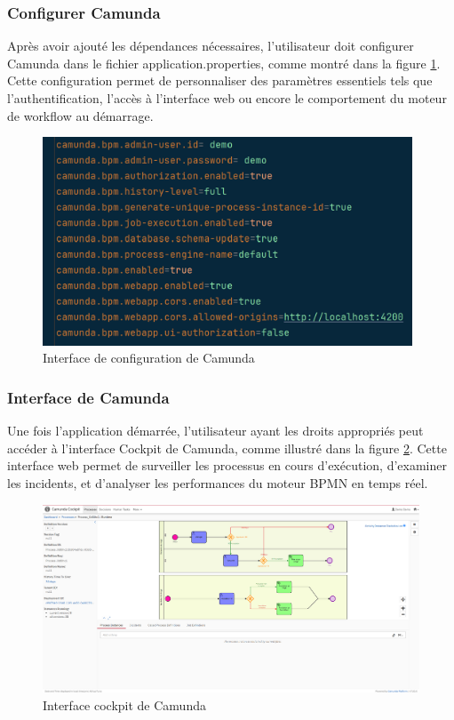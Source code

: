 \subsubsection{Configurer Camunda}
Après avoir ajouté les dépendances nécessaires, l’utilisateur doit configurer Camunda dans le fichier application.properties, comme montré dans la figure \ref{fig:camunda-config}. Cette configuration permet de personnaliser des paramètres essentiels tels que l’authentification, l’accès à l’interface web ou encore le comportement du moteur de workflow au démarrage.
\begin{figure}[H]
     \centering
     \includegraphics[width=11cm]{images/realisation/camm.png}
     \caption{Interface de configuration de Camunda}
     \label{fig:camunda-config}
\end{figure}
\newpage
\subsubsection{Interface de Camunda}
Une fois l’application démarrée, l’utilisateur ayant les droits appropriés peut accéder à l’interface Cockpit de Camunda, comme illustré dans la figure \ref{fig:camunda-cockpit}. Cette interface web permet de surveiller les processus en cours d’exécution, d’examiner les incidents, et d’analyser les performances du moteur BPMN en temps réel.
\begin{figure}[H]
     \centering
     \includegraphics[width=15cm]{images/realisation/pit.png}
     \caption{Interface cockpit de Camunda}
     \label{fig:camunda-cockpit}
\end{figure}
